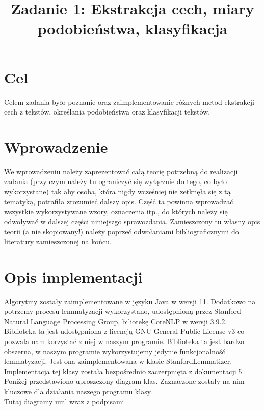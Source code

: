 \documentclass{classrep}
\author{
  \studentinfo{Stanisław Zakrzewski}{210360} \and
  \studentinfo{ Maciej Socha}{210321}
}
\title{Zadanie 1: Ekstrakcja cech, miary podobieństwa, klasyfikacja}
\begin{document}
\maketitle

\section{Cel}
Celem zadania było poznanie oraz zaimplementowanie różnych metod ekstrakcji cech z tekstów, określania podobieństwa oraz klasyfikacji tekstów.

\section{Wprowadzenie}
{\color{blue}
We wprowadzeniu należy zaprezentować całą teorię potrzebną do realizacji
zadania (przy czym należy tu ograniczyć się wyłącznie do tego, co było
wykorzystane) tak aby osoba, która nigdy wcześniej nie zetknęła się z tą
tematyką, potrafiła zrozumieć dalszy opis. Część ta powinna wprowadzać
wszystkie wykorzystywane wzory, oznaczenia itp., do których należy się
odwoływać w dalszej części niniejszgo sprawozdania. Zamieszczony tu własny
opis teorii (a nie skopiowany!) należy poprzeć odwołaniami bibliograficznymi
do literatury zamieszczonej na końcu. }

\section{Opis implementacji}
Algorytmy zostały zaimplementowane w języku Java w wersji 11. Dodatkowo na potrzemy procesu lemmatyzacji wykorzystano, udostępnioną przez Stanford Natural Language Processing Group, biliotekę CoreNLP w wersji 3.9.2. Biblioteka ta jest udostępniona z licencją GNU General Public License v3 co pozwala nam korzystać z niej w naszym programie. Biblioteka ta jest bardzo obszerna, w naszym programie wykorzystujemy jedynie funkcjonalność lemmatyzacji. Jest ona zaimplementowana w klasie StanfordLemmatizer. Implementacja tej klasy została bezpośrednio zaczerpnięta z dokumentacji[5]. Poniżej przedstawiono uproszczony diagram klas. Zaznaczone zostały na nim kluczowe dla działania naszego programu klasy.\\
{\color{red}
Tutaj diagramy uml wraz z podpisami\\}
\end{document}
